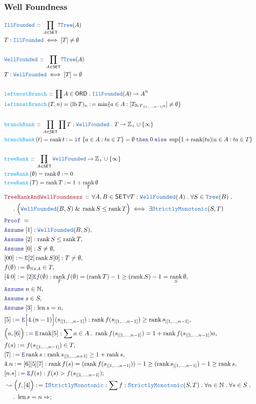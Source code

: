 \documentclass[12pt]{scrartcl}
\newcommand{\TYPE}[1]{\textcolor{NavyBlue}{\mathtt{#1}}}
\newcommand{\FUNC}[1]{\textcolor{Cerulean}{\mathtt{#1}}}
\newcommand{\LOGIC}[1]{\textcolor{Blue}{\mathtt{#1}}}
\newcommand{\THM}[1]{\textcolor{Maroon}{\mathtt{#1}}}
\renewcommand{\.}{\; . \;}
\newcommand{\de}{: \kern 0.1pc =}
\newcommand{\If}{\LOGIC{if} \;}
\newcommand{\Then}{ \; \LOGIC{then} \;}
\newcommand{\Else}{\; \LOGIC{else} \;}
\newcommand{\Act}[1]{\left( #1 \right)}
\newcommand{\Theorem}[2]{& \THM{#1} \, :: \, #2 \\ & \Proof = \\ }
\newcommand{\DeclareType}[2]{& \TYPE{#1} \, :: \, #2 \\}
\newcommand{\DefineType}[3]{& #1 : \TYPE{#2} \iff #3 \\}
\newcommand{\DeclareFunc}[2]{& \FUNC{#1} \, :: \, #2 \\}
\newcommand{\DefineNamedFunc}[4]{&  \FUNC{#1}\Act{#2} = #3 \de #4 \\}
\newcommand{\NewLine}{\\ & \kern 1pc}
\newcommand{\Page}[1]{ \begin{align*} #1 \end{align*}   }
\renewcommand{\And}{\; \& \;}
\newcommand{\Imply}{\Rightarrow}
\newcommand{\Intro}{\LOGIC{I}}
\newcommand{\Elim}{\LOGIC{E}}
\newcommand{\Int}{\mathbb{Z} }
\newcommand{\Nat}{\mathbb{N} }
\newcommand{\Say}[3]{& #1 \de #2 : #3, \\}
\newcommand{\SayIn}[3]{& #1 \de #2 \in #3, \\}
\newcommand{\Conclude}[3]{& #1 \de #2 : #3; \\}
\newcommand{\DeriveConclude}[3]{& \leadsto #1 \de #2 : #3 ; \\}
\newcommand{\Assume}[2]{& \LOGIC{Assume} \; #1 : #2, \\}
\newcommand{\AssumeIn}[2]{& \LOGIC{Assume} \; #1 \in #2, \\}
\newcommand{\Proof}{\LOGIC{Proof} \; }
\newcommand{\SET}{\mathsf{SET}}
\newcommand{\WF}{\TYPE{WellFounded}}
\newcommand{\ORD}{\mathsf{ORD}}
\DeclareMathOperator{\rank}{rank}
\newcommand{\Tree}{\TYPE{Tree}}
\DeclareMathOperator{\len}{len}
\newcommand{\inits}[2]{{#1}_{|\left[1,\ldots,#2\right]}}
\DeclareMathOperator{\lb}{lb}
\begin{document}
\subsubsection{Well Foundness}
\Page{
	\DeclareType{IllFounded}{\prod_{A \in \SET} ?\Tree(A)}
	\DefineType{T}{IllFounded}{[T]\neq \emptyset}
	\\
	\DeclareType{WellFounded}{\prod_{A \in \SET} ?\Tree(A)}
	\DefineType{T}{WellFounded}{[T] = \emptyset}
	\\
	\DeclareFunc{leftmostBranch}
	{
		\prod A \in \ORD \. \TYPE{IllFounded}(A) \to A^\Nat
	}
	\DefineNamedFunc{leftmostBranch}{T,n}{(\lb T)_n}
	{
		\min \{ a \in A :  [T_{\inits{\lb T}{n-1}a}] \neq \emptyset \}
	}
	\\
	\DeclareFunc{branchRank}{\prod_{A \in \SET} \prod T :  \TYPE{WellFounded} \. T \to \Int_+ \cup \{\infty\}}
	\DefineNamedFunc{branchRank}{t}{\rank t}{
		\If \{ a \in A : ta \in T  \} = \emptyset
		\Then 0
		\Else \sup \{ 1 + \rank(ta) | a \in A : ta \in T   \}
	}
	\\
	\DeclareFunc{treeRank}{\prod_{A \in \SET}  \TYPE{WellFounded} \to \Int_+ \cup \{\infty\}}
	\DefineNamedFunc{treeRank}{\emptyset}{\rank \emptyset}{0}
	\DefineNamedFunc{treeRank}{T}{\rank T}
	{
		1 + \rank_T \emptyset
	}
}\Page{
	\Theorem{TreeRankAndWellFoundness}
	{
		\forall A,B \in \SET 
		\forall T : \WF(A) \.
		\forall S \in \Tree(B) \. 
		\NewLine \. 
		\Big( \WF(B,S) \And \rank S \le \rank T  \Big)
		\iff \exists \TYPE{StrictlyMonotonic}(S,T)
	}
	\Assume{[1]}{\WF(B,S)}
	\Assume{[2]}{\rank S \le \rank T}
	\Assume{[0]}{S \neq \emptyset}
	\Say{[00]}{\Elim [2]\rank S [0]}{T \neq \emptyset}
	\SayIn{f(\emptyset)}{\emptyset_{\Nat \times A}}{T}
	\Say{[4.0]}{[2]\Elim f(\emptyset)}{ 
		\rank_T f(\emptyset) = 
		(\rank T) - 1    \ge 
		(\rank S) - 1 = 
		\rank_S \emptyset
	}
	\AssumeIn{n}{\Nat}
	\AssumeIn{s}{S}
	\Assume{[3]}{\len s = n}
	\Say{[5]}{\Elim \Big[4.(n-1)\Big](\inits{s}{n-1})}
	{
		\rank f(\inits{s}{n-1}) \ge \rank \inits{s}{n-1}
	}
	\Say{\Big(a,[6]\Big)}{\Elim \rank [5]}
	{
		\sum a \in A \. \rank f(\inits{s}{n-1}) = 1 + \rank f(\inits{s}{n-1})a
	}
	\SayIn{f(s)}{f(\inits{s}{n-1})}{T}
	\Say{[7]}{\Elim \rank s}{\rank \inits{s}{n+1} \ge 1 + \rank s}
	\Say{4.n}{[6][5][7]}
	{
		\rank f(s) =
		(\rank f(\inits{s}{n-1}) )  - 1  \ge 
		(\rank \inits{s}{n-1}) -1  \ge 
		\rank s
	}
	\Conclude{[n.*]}{\Elim f(s) }{ f(s) > f(\inits{s}{n-1})  }
	\DeriveConclude{\Big(f,[4]\Big)}{\Intro \TYPE{StrictlyMonotonic}}
	{
		\sum f : \TYPE{StrictlyMonotonic}(S,T) \. 
		\forall n \in \Nat \.
		\forall s \in S \. \NewLine \. 
		\len s = n \Imply 
}}
\end{document}

